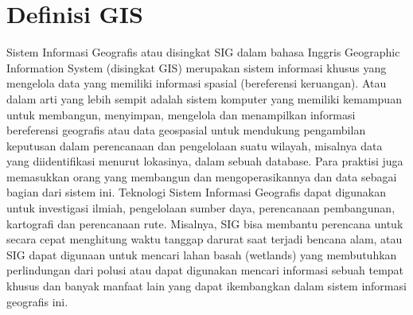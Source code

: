 \section{Definisi GIS} 
Sistem Informasi Geografis atau disingkat SIG dalam bahasa Inggris Geographic Information System (disingkat GIS) merupakan sistem informasi khusus yang mengelola data yang memiliki informasi spasial (bereferensi keruangan). Atau dalam arti yang lebih sempit adalah sistem komputer yang memiliki kemampuan untuk membangun, menyimpan, mengelola dan menampilkan informasi bereferensi geografis atau data geospasial untuk mendukung pengambilan keputusan dalam perencanaan dan pengelolaan suatu wilayah, misalnya data yang diidentifikasi menurut lokasinya, dalam sebuah database. Para praktisi juga memasukkan orang yang membangun dan mengoperasikannya dan data sebagai bagian dari sistem ini. 
Teknologi Sistem Informasi Geografis dapat digunakan untuk investigasi ilmiah, pengelolaan sumber daya, perencanaan pembangunan, kartografi dan perencanaan rute. Misalnya, SIG bisa membantu perencana untuk secara cepat menghitung waktu tanggap darurat saat terjadi bencana alam, atau SIG dapat digunaan untuk mencari lahan basah (wetlands) yang membutuhkan perlindungan dari polusi atau dapat digunakan mencari informasi sebuah tempat khusus dan banyak manfaat lain yang dapat ikembangkan dalam sistem informasi geografis ini. 


